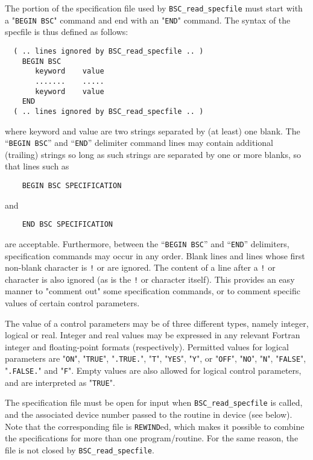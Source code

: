 \documentclass{galahad}
\newcommand{\packagename}{BSC}
\begin{document}
The portion of the specification file used by
{\tt \packagename\_read\_specfile}
must start
with a "{\tt BEGIN \packagename}" command and end with an
"{\tt END}" command.  The syntax of the specfile is thus defined as follows:
\begin{verbatim}
  ( .. lines ignored by BSC_read_specfile .. )
    BEGIN BSC
       keyword    value
       .......    .....
       keyword    value
    END
  ( .. lines ignored by BSC_read_specfile .. )
\end{verbatim}
where keyword and value are two strings separated by (at least) one blank.
The ``{\tt BEGIN \packagename}'' and ``{\tt END}'' delimiter command lines
may contain additional (trailing) strings so long as such strings are
separated by one or more blanks, so that lines such as
\begin{verbatim}
    BEGIN BSC SPECIFICATION
\end{verbatim}
and
\begin{verbatim}
    END BSC SPECIFICATION
\end{verbatim}
are acceptable. Furthermore,
between the
``{\tt BEGIN \packagename}'' and ``{\tt END}'' delimiters,
specification commands may occur in any order.  Blank lines and
lines whose first non-blank character is {\tt !} or {\tt *} are ignored.
The content
of a line after a {\tt !} or {\tt *} character is also
ignored (as is the {\tt !} or {\tt *}
character itself). This provides an easy manner to "comment out" some
specification commands, or to comment specific values
of certain control parameters.

The value of a control parameters may be of three different types, namely
integer, logical or real.
Integer and real values may be expressed in any relevant Fortran integer and
floating-point formats (respectively). Permitted values for logical
parameters are "{\tt ON}", "{\tt TRUE}", "{\tt .TRUE.}", "{\tt T}",
"{\tt YES}", "{\tt Y}", or "{\tt OFF}", "{\tt NO}",
"{\tt N}", "{\tt FALSE}", "{\tt .FALSE.}" and "{\tt F}".
Empty values are also allowed for
logical control parameters, and are interpreted as "{\tt TRUE}".

The specification file must be open for
input when {\tt \packagename\_read\_specfile}
is called, and the associated device number
passed to the routine in device (see below).
Note that the corresponding
file is {\tt REWIND}ed, which makes it possible to combine the specifications
for more than one program/routine.  For the same reason, the file is not
closed by {\tt \packagename\_read\_specfile}.
\end{document}
